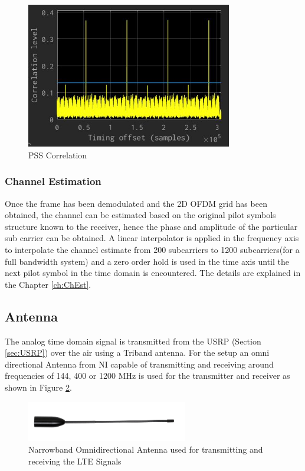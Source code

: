 \begin{figure}[H]
    \begin{center}
        \includegraphics[width=9cm]{images/PSSCorrelation.jpg}
        \caption{PSS Correlation}
        \label{fig:PSSCorr}
    \end{center}
\end{figure}

\subsubsection{Channel Estimation}

Once the frame has been demodulated and the 2D OFDM grid has been obtained, the channel can be estimated based on the original pilot symbols structure known to the receiver, hence the phase and amplitude of the particular sub carrier can be obtained. A linear interpolator is applied in the frequency axis to interpolate the channel estimate from 200 subcarriers to 1200 subcarriers(for a full bandwidth system) and a zero order hold is used in the time axis until the next pilot symbol in the time domain is encountered. The details are explained in the Chapter \ref{ch:ChEst}.


\subsection{Antenna}
The analog time domain signal is transmitted from the USRP (Section \ref{sec:USRP}) over the air using a Triband antenna. For the setup an omni directional Antenna from NI capable of transmitting and receiving around frequencies of 144, 400 or 1200 \si{\mega\hertz} is used for the transmitter and receiver as shown in Figure \ref{fig:USRPAnt}.

\begin{figure}[H]
    \begin{center}
        \includegraphics[width=7cm]{images/vert400.jpg}
        \caption{Narrowband Omnidirectional Antenna used for transmitting and receiving the LTE Signals}
        \label{fig:USRPAnt}
    \end{center}
\end{figure}
